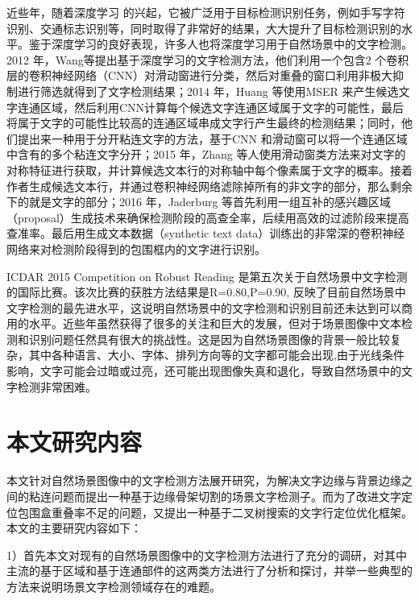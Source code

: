     近些年，随着深度学习\cite{Moral2010Foundations} 的兴起，它被广泛用于目标检测识别任务，例如手写字符识别、交通标志识别等，同时取得了非常好的结果，大大提升了目标检测识别的水平。鉴于深度学习的良好表现，许多人也将深度学习用于自然场景中的文字检测。2012 年，Wang\cite{Wang2012End}等提出基于深度学习的文字检测方法，他们利用一个包含2 个卷积层的卷积神经网络（CNN）对滑动窗进行分类，然后对重叠的窗口利用非极大抑制进行筛选就得到了文字检测结果；2014 年，Huang\cite{Huang2014Robust} 等使用MSER 来产生候选文字连通区域，然后利用CNN计算每个候选文字连通区域属于文字的可能性，最后将属于文字的可能性比较高的连通区域串成文字行产生最终的检测结果；同时，他们提出来一种用于分开粘连文字的方法，基于CNN 和滑动窗可以将一个连通区域中含有的多个粘连文字分开；2015 年，Zhang\cite{Zhang2015Symmetry} 等人使用滑动窗类方法来对文字的对称特征进行获取，并计算候选文本行的对称轴中每个像素属于文字的概率。接着作者生成候选文本行，并通过卷积神经网络滤除掉所有的非文字的部分，那么剩余下的就是文字的部分；2016 年，Jaderburg\cite{Jaderberg2016Reading} 等首先利用一组互补的感兴趣区域（proposal）生成技术来确保检测阶段的高查全率，后续用高效的过滤阶段来提高查准率。最后用生成文本数据（synthetic text data）训练出的非常深的卷积神经网络来对检测阶段得到的包围框内的文字进行识别。

    ICDAR 2015 Competition on Robust Reading 是第五次关于自然场景中文字检测的国际比赛。该次比赛的获胜方法结果是R=0.80,P=0.90, 反映了目前自然场景中文字检测的最先进水平，这说明自然场景中的文字检测和识别目前还未达到可以商用的水平。近些年虽然获得了很多的关注和巨大的发展，但对于场景图像中文本检测和识别问题任然具有很大的挑战性。这是因为自然场景图像的背景一般比较复杂，其中各种语言、大小、字体、排列方向等的文字都可能会出现,由于光线条件影响，文字可能会过暗或过亮，还可能出现图像失真和退化，导致自然场景中的文字检测非常困难。

    \section{本文研究内容}

    本文针对自然场景图像中的文字检测方法展开研究，为解决文字边缘与背景边缘之间的粘连问题而提出一种基于边缘骨架切割的场景文字检测子。而为了改进文字定位包围盒重叠率不足的问题，又提出一种基于二叉树搜索的文字行定位优化框架。本文的主要研究内容如下：

    1）首先本文对现有的自然场景图像中的文字检测方法进行了充分的调研，对其中主流的基于区域和基于连通部件的这两类方法进行了分析和探讨，并举一些典型的方法来说明场景文字检测领域存在的难题。

